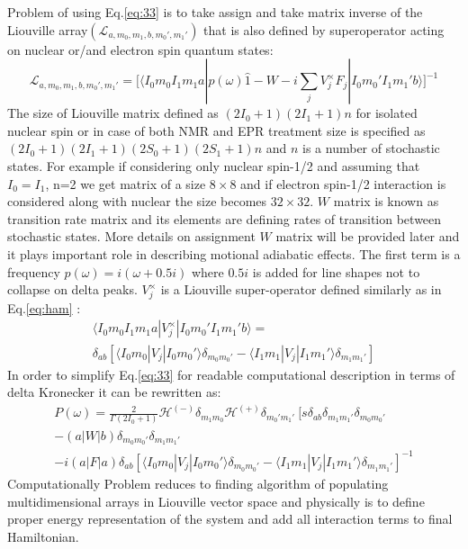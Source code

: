 Problem of using Eq.\ref{eq:33} is to take assign and take matrix inverse of the Liouville array$(\mathcal{L}_{a,m_0,m_1,b,m_0',m_1'})$ that is also defined by superoperator acting on nuclear or/and electron spin quantum states: 
\begin{equation}\label{eq:35}
\mathcal{L}_{a,m_0,m_1,b,m_0',m_1'}=\Big[\langle I_0m_0I_1m_1a|p(\omega)\hat1 - W-i\sum_jV_j^{\times} F_j|I_0m_0'I_1m_1'b\rangle\Big]^{-1}  
\end{equation}
The size of Liouville matrix defined as $(2I_0+1)(2I_1+1)n$ for isolated nuclear spin or in case of both NMR and EPR treatment size is specified as $(2I_0+1)(2I_1+1)(2S_0+1)(2S_1+1)n$
and $n$ is a number of stochastic states. For example if considering only nuclear spin-1/2 and  assuming that $I_0=I_1$, n=2 we get matrix of a size $8\times 8$ and if electron spin-1/2 interaction is considered along with nuclear the size becomes $32\times 32$. $W$ matrix is known as transition rate matrix and its elements are defining rates of transition between stochastic states. More details on assignment $W$ matrix will be provided later and it plays important role in describing motional adiabatic effects. The first term is a frequency $p(\omega)=i(\omega+0.5i)$ where $0.5i$ is added for line shapes not to collapse on delta peaks. $V^{\times}_j$ is a Liouville super-operator defined similarly as in Eq.\ref{eq:ham} : 
\begin{multline}\label{eq:36}
\langle I_0m_0I_1m_1a|V^{\times}_j|I_0m_0'I_1m_1'b\rangle= \\
\delta_{ab}[\langle I_0m_0|V_j|I_0m_0'\rangle \delta_{m_0m_ 0'}-\langle I_1m_1|V_j|I_1m_1'\rangle \delta_{m_1m_1'}]
\end{multline}
In order to simplify Eq.\ref{eq:33} for readable computational description  in terms of delta Kronecker it can be rewritten as: 
\begin{multline}\label{eq:37}
P(\omega)=
\frac{2}{\Gamma(2I_0+1)}\mathcal{H}^{(-)}\delta_{m_1m_0}\mathcal{H}^{(+)}\delta_{m_0'm_1'} \ [s\delta_{ab}\delta_{m_1m_1'}\delta_{m_0m_0'} \\-(a|W|b)\delta_{m_0m_0'}\delta_{m_1m_1'} \\ -i(a|F|a)\delta_{ab}[\langle I_0m_0|V_j|I_0m_0'\rangle \delta_{m_0m_ 0'}-\langle I_1m_1|V_j|I_1m_1'\rangle \delta_{m_1m_1'}]^{-1}
\end{multline}   
Computationally Problem reduces to finding algorithm of populating multidimensional arrays in Liouville vector space and physically is to define proper energy representation of the system and add all interaction terms to final Hamiltonian.     
\clearpage 